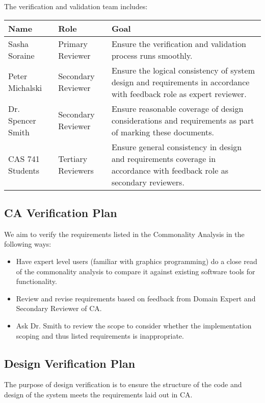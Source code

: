 \documentclass[12pt, titlepage]{article}
\begin{document}
The verification and validation team includes:

\begin{table}[h]
	\begin{tabular}{|l|l|p{9cm}|}
		\hline
		\textbf{Name} & \textbf{Role} & \textbf{Goal} \\
		\hline
		Sasha Soraine & Primary Reviewer& Ensure the verification and 
		validation 
		process runs smoothly.\\
		Peter Michalski & Secondary Reviewer& Ensure the logical consistency of 
		system 
		design and requirements in accordance with feedback role as expert 
		reviewer. \\
		Dr. Spencer Smith & Secondary Reviewer& Ensure reasonable coverage of 
		design 
		considerations and requirements as part of marking these documents. \\
		CAS 741 Students & Tertiary Reviewers& Ensure general consistency in 
		design and 
		requirements coverage in accordance with feedback role as secondary 
		reviewers.\\
		\hline
	\end{tabular}
\end{table}

\pagebreak
\subsection{CA Verification Plan}

We aim to verify the requirements listed in the Commonality Analysis in the 
following ways:

\begin{itemize}
	\item Have expert level users (familiar with graphics programming) do a 
	close read of the commonality analysis to compare it against existing 
	software tools for functionality.
	\item Review and revise requirements based on feedback from Domain Expert 
	and Secondary Reviewer of CA.
	\item Ask Dr. Smith to review the scope to consider whether the 
	implementation scoping and thus listed requirements is inappropriate.
\end{itemize}

\subsection{Design Verification Plan}
The purpose of design verification is to ensure the structure of the code and 
design of the system meets the requirements laid out in CA.
\end{document}
